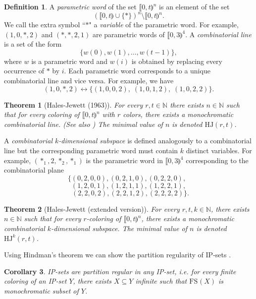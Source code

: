 \documentclass{article}
\theoremstyle{definition}
\newtheorem{definition}{Definition}[section]
\theoremstyle{plain}
\newtheorem{theorem}{Theorem}[section]
\newtheorem{corollary}[theorem]{Corollary}
\theoremstyle{remark}
\newcommand{\N}{\ensuremath{\mathbb{N}}}
\newcommand{\HJ}{\ensuremath{\mathrm{HJ}}}
\newcommand{\FS}[2][]{\ensuremath{\mathrm{FS}^{#1}\left(#2\right)}}
\begin{document}
\begin{definition}\label{parametricword}
    A \emph{parametric word} of the set $\llbracket 0,t \rrparenthesis^n$ is an element of the set
    $$\left (\llbracket 0,t \rrparenthesis \cup \{*\} \right)^n \setminus \llbracket 0,t \rrparenthesis^n.$$
    We call the extra symbol “$*$" a \emph{variable} of the parametric word. For example, $(1,0,*,2)$ and $(*,*,2,1)$ are parametric words of $\llbracket 0,3 \rrparenthesis^4$.
    A \emph{combinatorial line} is a set of the form 
    $$\{w(0), w(1),\ldots,w(t-1)\},$$
    where $w$ is a parametric word and $w(i)$ is obtained by replacing every occurrence of $*$ by $i$. Each parametric word corresponds to a unique combinatorial line and vice versa. For example, we have 
    $$(1,0,*,2) \leftrightarrow \{(1,0,0,2),\;(1,0,1,2),\;(1,0,2,2)\}.$$    
\end{definition}

\begin{theorem}[Hales-Jewett (1963)]
    For every $r,t \in \N$ there exists $n\in \N$ such that for every coloring of $\llbracket 0,t \rrparenthesis^n$ with $r$ colors, there exists a monochromatic combinatorial line. (See also \cite{HJ63}) The minimal value of $n$ is denoted $\HJ(r,t)$.
\end{theorem}

A \emph{combinatorial $k$-dimensional subspace} is defined analogously to a combinatorial line but the corresponding parametric word must contain $k$ distinct variables. For example, $(*_1,2,*_2,*_1)$ is the parametric word in $\llbracket 0,3 \rrparenthesis^4$ corresponding to the combinatorial plane
    $$\{(0,2,0,0),(0,2,1,0),(0,2,2,0),\phantom{\}}$$
    $$\phantom{\{}(1,2,0,1),(1,2,1,1),(1,2,2,1),\phantom{\}}$$
    $$\phantom{\{}(2,2,0,2),(2,2,1,2),(2,2,2,2)\}.$$
    
\begin{theorem}[Hales-Jewett (extended version)]\label{ExtendedHalesJewett}
    For every $r,t,k \in \N$, there exists $n \in \N$ such that for every $r$-coloring of $\llbracket 0,t \rrparenthesis^n$, there exists a monochromatic combinatorial $k$-dimensional subspace. The minimal value of $n$ is denoted $\HJ^k(r,t)$.
\end{theorem}

Using Hindman's theorem \cite{Hin74} we can show the partition regularity of IP-sets \cite{Zhou17}.
\begin{corollary}\label{IPpartregIP}
    IP-sets are partition regular in any IP-set, i.e. for every finite coloring of an IP-set $Y$, there exists $X \subseteq Y$ infinite such that $\FS{X}$ is monochromatic subset of $Y$.
\end{corollary}
\end{document}
